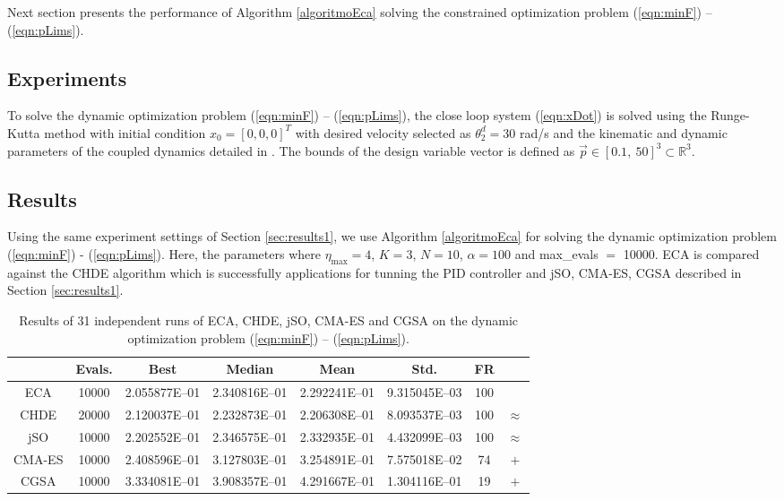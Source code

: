 \documentclass[12pt,letterpape]{article}
\begin{document}
Next section presents the performance of Algorithm \ref{algoritmoEca} solving the
constrained optimization problem (\ref{eqn:minF}) -- (\ref{eqn:pLims}).

\subsection{Experiments} %

To solve the dynamic optimization problem (\ref{eqn:minF}) -- (\ref{eqn:pLims}),
the close loop system (\ref{eqn:xDot}) is solved using the Runge-Kutta method
\cite{dormand80} with initial condition $x_0 = [0,0,0]^T$ with desired
velocity selected as $\theta_2^d = 30$ rad/s and the kinematic and dynamic parameters
of the coupled dynamics detailed in \cite{calva13}. The bounds of the design
variable vector is defined as $\vec{p} \in [0.1, \ 50]^3 \subset \mathbb{R}^3 $.\\

\subsection{Results} %
\label{sub:results}

Using the same experiment settings of Section \ref{sec:results1}, we use Algorithm 
\ref{algoritmoEca} for solving the dynamic optimization problem (\ref{eqn:minF}) - (\ref{eqn:pLims}).
Here, the parameters where $\eta_{\max} = 4$, $K = 3$, $N = 10$, $\alpha = 100$
and max\_evals $=$ 10000. ECA is compared against the CHDE algorithm which is 
successfully applications for tunning the PID controller \cite{calva13} and jSO,
CMA-ES, CGSA described in Section \ref{sec:results1}.\\

%
\begin{table}[!ht]
	\centering
	\begin{tabular}{cccccccc}
		\hline
		& {\bf Evals.} & {\bf Best} & {\bf Median} & {\bf Mean} & {\bf Std.} & \textbf{FR} \\ \hline
		ECA   & 10000 & 2.055877E--01 & 2.340816E--01 & 2.292241E--01  & 9.315045E--03  & 100 &  \\ \hline
		CHDE  & 20000 & 2.120037E--01 & 2.232873E--01 & 2.206308E--01  & 8.093537E--03  & 100 & $\approx$ \\ \hline
		jSO   & 10000 & 2.202552E--01 & 2.346575E--01 & 2.332935E--01  & 4.432099E--03  & 100 & $\approx$ \\ \hline
		CMA-ES& 10000 & 2.408596E--01 & 3.127803E--01 & 3.254891E--01  & 7.575018E--02  &  74 & $+$ \\ \hline
		CGSA  & 10000 & 3.334081E--01 & 3.908357E--01 & 4.291667E--01  & 1.304116E--01  &  19 & $+$ \\ \hline
	\end{tabular}
	\caption{Results of 31 independent runs of ECA, CHDE, jSO, CMA-ES and CGSA on the dynamic optimization problem (\ref{eqn:minF}) -- (\ref{eqn:pLims}).}
	\label{tab:res2}
\end{table}
\begin{tabular}{clcccccc}
\end{tabular}%
% 
\end{document}
